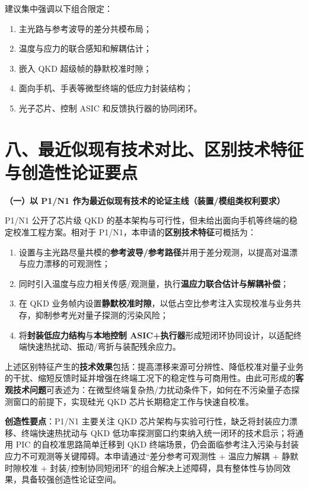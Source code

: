 \documentclass[12pt,a4paper]{article}
\begin{document}
建议集中强调以下组合限定：
\begin{enumerate}[label=(\arabic*)]
    \item 主光路与参考波导的差分共模布局；
    \item 温度与应力的联合感知和解耦估计；
    \item 嵌入 QKD 超级帧的静默校准时隙；
    \item 面向手机、手表等微型终端的低应力封装结构；
    \item 光子芯片、控制 ASIC 和反馈执行器的协同闭环。
\end{enumerate}

\section*{八、最近似现有技术对比、区别技术特征与创造性论证要点}

\textbf{（一）以 P1/N1 作为最近似现有技术的论证主线（装置/模组类权利要求）}

P1/N1 公开了芯片级 QKD 的基本架构与可行性，但未给出面向手机等终端的稳定校准工程方案。相对于 P1/N1，本申请的\textbf{区别技术特征}可概括为：
\begin{enumerate}[label=(\arabic*)]
    \item 设置与主光路尽量共模的\textbf{参考波导/参考路径}并用于差分观测，以提高对温漂与应力漂移的可观测性；
    \item 同时引入温度与应力相关传感/观测量，执行\textbf{温应力联合估计与解耦补偿}；
    \item 在 QKD 业务帧内设置\textbf{静默校准时隙}，以低占空比参考注入实现校准与业务共存，抑制参考光对量子探测的污染风险；
    \item 将\textbf{封装低应力结构}与\textbf{本地控制 ASIC+执行器}形成短闭环协同设计，以适配终端快速热扰动、振动/弯折与装配残余应力。
\end{enumerate}

上述区别特征产生的\textbf{技术效果}包括：提高漂移来源可分辨性、降低校准对量子业务的干扰、缩短反馈时延并增强在终端工况下的稳定性与可商用性。由此可形成的\textbf{客观技术问题}可表述为：在微型终端复杂热/力扰动条件下，如何在不污染量子态探测窗口的前提下，实现硅光 QKD 芯片长期稳定工作与快速自校准。

\textbf{创造性要点}：P1/N1 主要关注 QKD 芯片架构与实验可行性，缺乏将封装应力漂移、终端快速热扰动与 QKD 低功率探测窗口约束纳入统一闭环的技术启示；将通用 PIC 的自校准思路简单迁移到 QKD 终端场景，仍会面临参考注入污染与封装应力不可观测等关键障碍。本申请通过“差分参考可观测性 + 温应力解耦 + 静默时隙校准 + 封装/控制协同短闭环”的组合解决上述障碍，具有整体性与协同效果，具备较强创造性论证空间。
\end{document}
